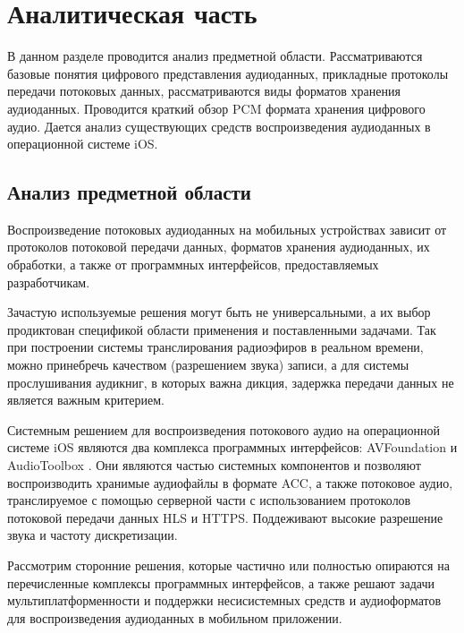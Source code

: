 \setupsectionbase
\section{Аналитическая часть}

	\par В данном разделе проводится анализ предметной области. 
	Рассматриваются базовые понятия цифрового представления аудиоданных,
	прикладные протоколы передачи потоковых данных, 
	рассматриваются виды форматов хранения аудиоданных.
	Проводится краткий обзор PCM формата хранения цифрового аудио.
	Дается анализ существующих средств воспроизведения аудиоданных в операционной системе iOS.

\subsection{Анализ предметной области}
	\par Воспроизведение потоковых аудиоданных на мобильных устройствах зависит от 
	протоколов потоковой передачи данных, форматов хранения аудиоданных, их обработки,
	а также от программных интерфейсов, предоставляемых разработчикам. 
	
	\par Зачастую используемые решения могут быть не универсальными, 
	а их выбор продиктован спецификой области применения и поставленными задачами.
	Так при построении системы транслирования радиоэфиров в реальном времени, можно принебречь качеством (разрешением звука) записи,
	а для системы прослушивания аудикниг, в которых важна дикция, задержка передачи данных не является важным критерием.

	\par Системным решением для воспроизведения потокового аудио на операционной системе iOS являются два
	комплекса программных интерфейсов: \newline AVFoundation \cite{avfoundation} и AudioToolbox \cite{audiotoolbox}. 
	Они являются частью системных компонентов и позволяют воспроизводить хранимые аудиофайлы в формате ACC, а также потоковое аудио, 
	транслируемое с помощью серверной части с использованием протоколов потоковой передачи данных HLS и HTTPS.
	Поддеживают высокие разрешение звука и частоту дискретизации.

	\par Рассмотрим сторонние решения, которые частично или полностью опираются на перечисленные комплексы программных интерфейсов, 
	а также решают задачи мультиплатформенности и поддержки несисистемных средств и аудиоформатов для воспроизведения аудиоданных в мобильном приложении.  

